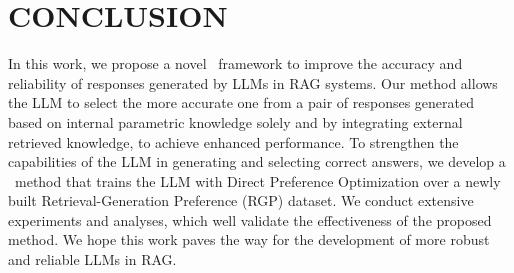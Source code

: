 
\section{CONCLUSION}
In this work, we propose a novel \framework~framework to improve the accuracy and reliability of responses generated by LLMs in RAG systems.
Our method allows the LLM to select the more accurate one from a pair of responses generated based on internal parametric knowledge solely and by integrating external retrieved knowledge, to achieve enhanced performance. 
To strengthen the capabilities of the LLM in generating and selecting correct answers, we develop a \approach~method that trains the LLM with Direct Preference Optimization over a newly built Retrieval-Generation Preference (RGP) dataset. 
We conduct extensive experiments and analyses, which well validate the effectiveness of the proposed method. 
We hope this work paves the way for the development of more robust and reliable LLMs in RAG.